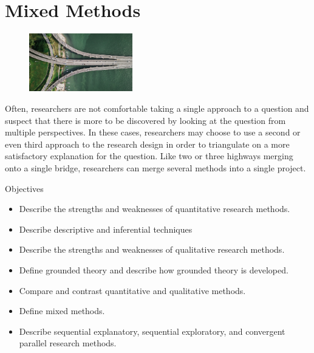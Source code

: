 \chapter{Mixed Methods}\label{ch14:mixed}

\begin{figure}
	\centering
	\includegraphics[width=0.4\textwidth]{gfx/14-intersection} 
\end{figure}

Often, researchers are not comfortable taking a single approach to a question and suspect that there is more to be discovered by looking at the question from multiple perspectives. In these cases, researchers may choose to use a second or even third approach to the research design in order to triangulate on a more satisfactory explanation for the question. Like two or three highways merging onto a single bridge, researchers can merge several methods into a single project.

\begin{center}
	\begin{objbox}{Objectives}
		\begin{itemize}
			\setlength{\itemsep}{0pt}
			\setlength{\parskip}{0pt}
			\setlength{\parsep}{0pt}
			
			\item Describe the strengths and weaknesses of quantitative research methods.
			\item Describe descriptive and inferential techniques
			\item Describe the strengths and weaknesses of qualitative research methods.
			\item Define grounded theory and describe how grounded theory is developed.
			\item Compare and contrast quantitative and qualitative methods.
			\item Define mixed methods.
			\item Describe sequential explanatory, sequential exploratory, and convergent parallel research methods.
		\end{itemize}
	\end{objbox}
\end{center}

